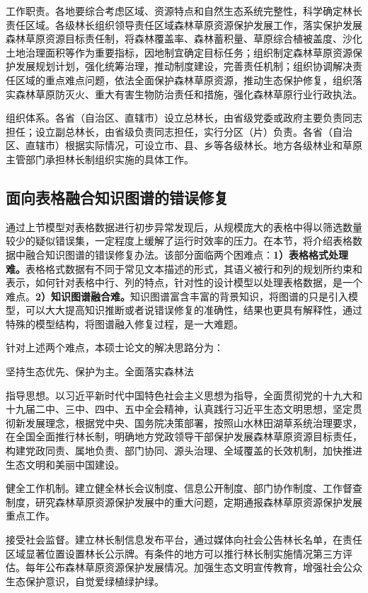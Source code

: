 工作职责。各地要综合考虑区域、资源特点和自然生态系统完整性，科学确定林长责任区域。各级林长组织领导责任区域森林草原资源保护发展工作，落实保护发展森林草原资源目标责任制，将森林覆盖率、森林蓄积量、草原综合植被盖度、沙化土地治理面积等作为重要指标，因地制宜确定目标任务；组织制定森林草原资源保护发展规划计划，强化统筹治理，推动制度建设，完善责任机制；组织协调解决责任区域的重点难点问题，依法全面保护森林草原资源，推动生态保护修复，组织落实森林草原防灭火、重大有害生物防治责任和措施，强化森林草原行业行政执法。

组织体系。各省（自治区、直辖市）设立总林长，由省级党委或政府主要负责同志担任；设立副总林长，由省级负责同志担任，实行分区（片）负责。各省（自治区、直辖市）根据实际情况，可设立市、县、乡等各级林长。地方各级林业和草原主管部门承担林长制组织实施的具体工作。

\subsection{面向表格融合知识图谱的错误修复}

通过上节模型对表格数据进行初步异常发现后，从规模庞大的表格中得以筛选数量较少的疑似错误集，一定程度上缓解了运行时效率的压力。在本节，将介绍表格数据中融合知识图谱的错误修复办法。该部分面临两个困难点：\textbf{1）表格格式处理难。}表格格式数据有不同于常见文本描述的形式，其语义被行和列的规划所约束和表示，如何针对表格中行、列的特点，针对性的设计模型以处理表格数据，是一个难点。\textbf{2）知识图谱融合难。}知识图谱富含丰富的背景知识，将图谱的只是引入模型，可以大大提高知识推断或者说错误修复的准确性，结果也更具有解释性，通过特殊的模型结构，将图谱融入修复过程，是一大难题。

针对上述两个难点，本硕士论文的解决思路分为：

\subtitle{1)}{坚持生态优先、保护为主。全面落实森林法}

指导思想。以习近平新时代中国特色社会主义思想为指导，全面贯彻党的十九大和十九届二中、三中、四中、五中全会精神，认真践行习近平生态文明思想，坚定贯彻新发展理念，根据党中央、国务院决策部署，按照山水林田湖草系统治理要求，在全国全面推行林长制，明确地方党政领导干部保护发展森林草原资源目标责任，构建党政同责、属地负责、部门协同、源头治理、全域覆盖的长效机制，加快推进生态文明和美丽中国建设。

健全工作机制。建立健全林长会议制度、信息公开制度、部门协作制度、工作督查制度，研究森林草原资源保护发展中的重大问题，定期通报森林草原资源保护发展重点工作。

接受社会监督。建立林长制信息发布平台，通过媒体向社会公告林长名单，在责任区域显著位置设置林长公示牌。有条件的地方可以推行林长制实施情况第三方评估。每年公布森林草原资源保护发展情况。加强生态文明宣传教育，增强社会公众生态保护意识，自觉爱绿植绿护绿。

